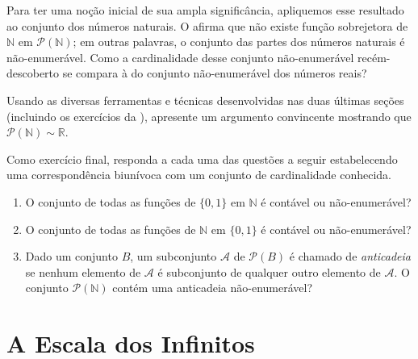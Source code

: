 Para ter uma noção inicial de sua ampla significância, apliquemos esse resultado ao conjunto dos números naturais. O  afirma que não existe função sobrejetora de $\mathbb{N}$ em $\mathcal{P}(\mathbb{N})$; em outras palavras, o conjunto das partes dos números naturais é não-enumerável. Como a cardinalidade desse conjunto não-enumerável recém-descoberto se compara à do conjunto não-enumerável dos números reais?  

\begin{exercise}\label{ex:PN-sim-R}
Usando as diversas ferramentas e técnicas desenvolvidas nas duas últimas seções (incluindo os exercícios da ), apresente um argumento convincente mostrando que $\mathcal{P}(\mathbb{N}) \sim \mathbb{R}$.
\end{exercise}

\begin{exercise}\label{ex:cardinalidades-conjuntos-funcoes}
Como exercício final, responda a cada uma das questões a seguir estabelecendo uma correspondência biunívoca com um conjunto de cardinalidade conhecida.
\begin{enumerate}[label=\alph*)]
\item O conjunto de todas as funções de $\{0, 1\}$ em $\mathbb{N}$ é contável ou não-enumerável?
\item O conjunto de todas as funções de $\mathbb{N}$ em $\{0, 1\}$ é contável ou não-enumerável?
\item Dado um conjunto $B$, um subconjunto $\mathcal{A}$ de $\mathcal{P}(B)$ é chamado de \textit{anticadeia} se nenhum elemento de $\mathcal{A}$ é subconjunto de qualquer outro elemento de $\mathcal{A}$. O conjunto $\mathcal{P}(\mathbb{N})$ contém uma anticadeia não-enumerável?
\end{enumerate}
\end{exercise}

\section{A Escala dos Infinitos}\label{sec:epilogo}


